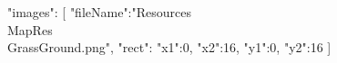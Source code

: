 {
	"images":
	[
		{
			"fileName":"Resources\\MapRes\\GrassGround.png",
			"rect":
			{
				"x1":0,
				"x2":16,
				"y1":0,
				"y2":16
			}
		}
	]
}